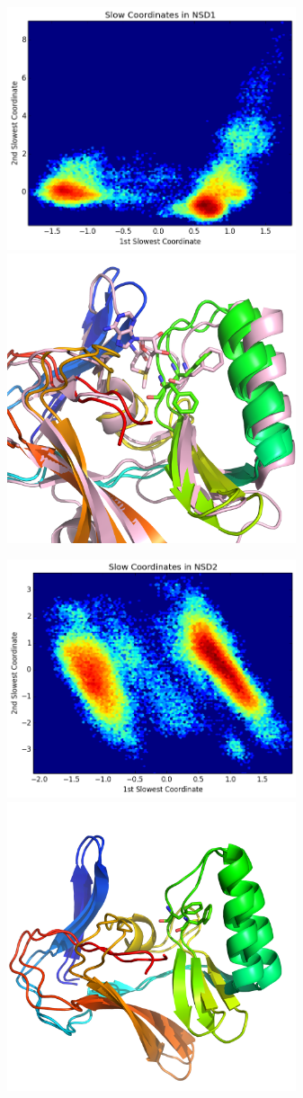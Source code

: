 \documentclass[12pt]{article}
\begin{document}
\includegraphics[width=8.5cm]{figures/NSD1_tics.png}
\includegraphics[width=8.5cm]{figures/NSD1_pdb.png}

\includegraphics[width=8.5cm]{figures/NSD2_tics.png}
\includegraphics[width=8.5cm]{figures/NSD2_pdb.png}
\end{document}
